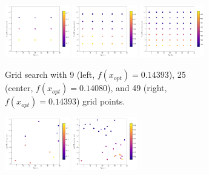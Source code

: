 \begin{figure}[htbp!]
	\begin{subfigure}{\textwidth}
		\centering
		\includegraphics[width=0.31\textwidth]{figures/Results/First_comparison/Grid10}
		\includegraphics[width=0.31\textwidth]{figures/Results/First_comparison/Grid30}
		\includegraphics[width=0.31\textwidth]{figures/Results/First_comparison/Grid50}
		\caption{ Grid search with 9 (left, $f(x_{opt}) = 0.14393$), 25 (center, $f(x_{opt}) = 0.14080$), and 49 (right, $f(x_{opt}) = 0.14393$) grid points.}
		\label{fig:first_comparison_grid_search}
	\end{subfigure}
	\begin{subfigure}{\textwidth}
		\centering
		\includegraphics[width=0.31\textwidth]{figures/Results/First_comparison/Random10}
		\includegraphics[width=0.31\textwidth]{figures/Results/First_comparison/Random30}

\end{subfigure}
\end{figure}
